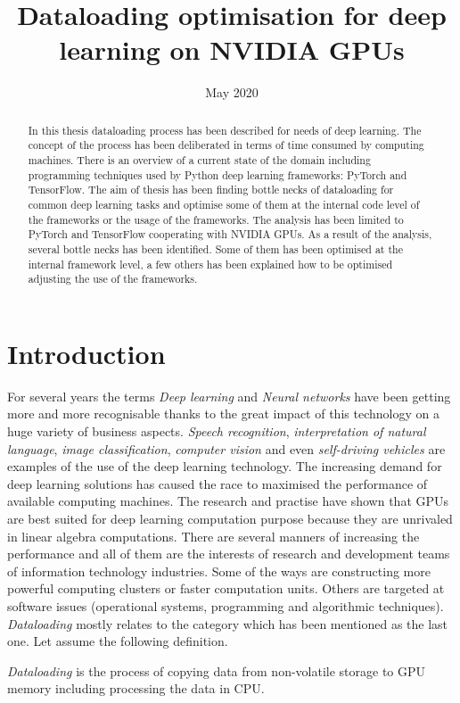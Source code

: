 \documentclass[licencjacka,en]{pracamgr}
\title{Dataloading optimisation for deep learning on NVIDIA GPUs}
\date{May 2020}
\begin{document}
\maketitle

\begin{abstract}
In this thesis dataloading process has been described for needs of deep learning. The concept of the process has been deliberated in terms of time consumed by computing machines. There is an overview of a current state of the domain including programming techniques used by Python deep learning frameworks: PyTorch and TensorFlow. The aim of thesis has been finding bottle necks of dataloading for common deep learning tasks and optimise some of them at the internal code level of the frameworks or the usage of the frameworks. The analysis has been limited to PyTorch and TensorFlow cooperating with NVIDIA GPUs. As a result of the analysis, several bottle necks has been identified. Some of them has been optimised at the internal framework level, a few others has been explained how to be optimised adjusting the use of the frameworks.
\end{abstract}

\tableofcontents

\chapter*{Introduction}

For several years the terms \emph{Deep learning} and \emph{Neural networks} have been getting more and more recognisable thanks to the great impact of this technology on a huge variety of business aspects. \emph{Speech recognition}, \emph{interpretation of natural language}, \emph{image classification}, \emph{computer vision} and even \emph{self-driving vehicles} are examples of the use of the deep learning technology. The increasing demand for deep learning solutions has caused the race to maximised the performance of available computing machines. The research and practise have shown that GPUs are best suited for deep learning computation purpose because they are unrivaled in linear algebra computations. There are several manners of increasing the performance and all of them are the interests of research and development teams of information technology industries. Some of the ways are constructing more powerful computing clusters or faster computation units. Others are targeted at software issues (operational systems, programming and algorithmic techniques). \emph{Dataloading} mostly relates to the category which has been mentioned as the last one. Let assume the following definition.

\emph{Dataloading} is the process of copying data from non-volatile storage to GPU memory including processing the data in CPU.

\end{document}

